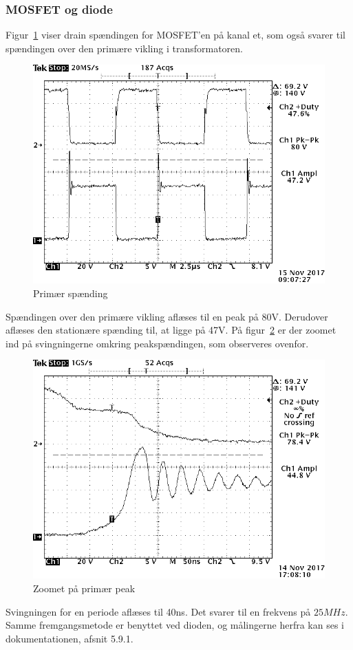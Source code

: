\subsubsection{MOSFET og diode}
\noindent Figur~\ref{fig: privolt} viser drain spændingen for MOSFET'en på kanal et, som også svarer til spændingen over den primære vikling i transformatoren.
\begin{figure}[H]
	\center
	\includegraphics[max width=0.7\linewidth]{../dokumentation/tex/2iteration/billeder/Realisering/Transformator_Primar.png}
	\caption{Primær spænding}
	\label{fig: privolt}
\end{figure}
\noindent Spændingen over den primære vikling aflæses til en peak på 80V. Derudover aflæses den stationære spænding til, at ligge på 47V. 
På figur~\ref{fig: prizoom} er der zoomet ind på svingningerne omkring peakspændingen, som observeres ovenfor.
\begin{figure}[H]
	\center
	\includegraphics[max width=0.7\linewidth]{../dokumentation/tex/2iteration/billeder/Realisering/Transformator_Primarzoom.png}
	\caption{Zoomet på primær peak}
	\label{fig: prizoom}
\end{figure}
\noindent Svingningen for en periode aflæses til 40ns. Det svarer til en frekvens på $25MHz$. Samme fremgangsmetode er benyttet ved dioden, og målingerne herfra kan ses i dokumentationen, afsnit 5.9.1.

